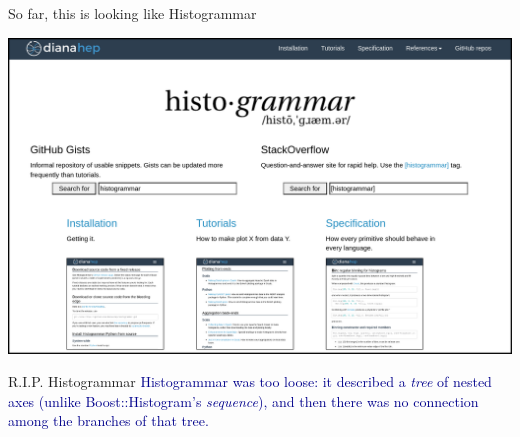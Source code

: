 \documentclass[aspectratio=169]{beamer}
\begin{document}
\begin{frame}{So far, this is looking like Histogrammar}
\vspace{0.08 cm}
\begin{center}
\includegraphics[width=0.9\linewidth]{histogrammar-website.png}
\end{center}
\end{frame}

\begin{frame}{R.I.P. Histogrammar}
\vspace{0.5 cm}
\Large
\textcolor{darkblue}{Histogrammar was too loose: it described a {\it tree} of nested axes (unlike Boost::Histogram's {\it sequence}), and then there was no connection among the branches of that tree.}

\vspace{1 cm}
\end{frame}
\end{document}
